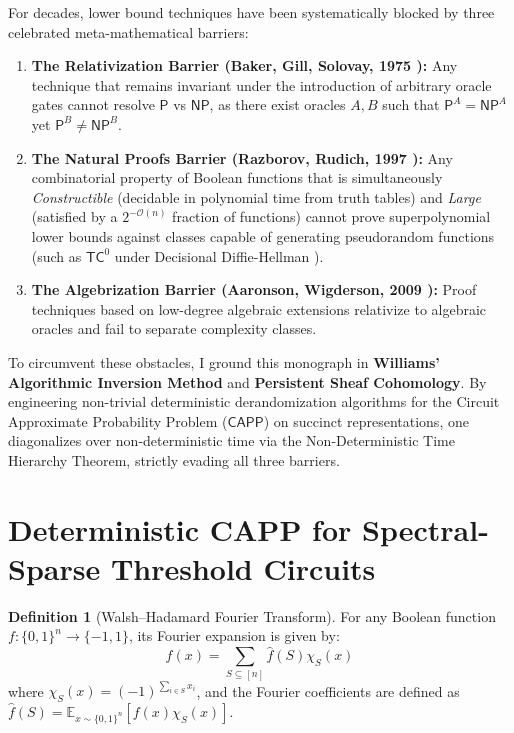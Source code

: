 \documentclass[11pt,a4paper]{article}
\theoremstyle{definition}
\newtheorem{definition}[theorem]{Definition}
\theoremstyle{remark}
\newcommand{\NP}{\mathsf{NP}}
\newcommand{\PP}{\mathsf{P}}
\newcommand{\TC}{\mathsf{TC}}
\newcommand{\CAPP}{\mathsf{CAPP}}
\newcommand{\E}{\mathbb{E}}
\begin{document}
For decades, lower bound techniques have been systematically blocked by three celebrated meta-mathematical barriers:
\begin{enumerate}
    \item \textbf{The Relativization Barrier (Baker, Gill, Solovay, 1975 \cite{bgs75}):} Any technique that remains invariant under the introduction of arbitrary oracle gates cannot resolve $\PP$ vs $\NP$, as there exist oracles $A, B$ such that $\PP^A = \NP^A$ yet $\PP^B \neq \NP^B$.
    \item \textbf{The Natural Proofs Barrier (Razborov, Rudich, 1997 \cite{rr97}):} Any combinatorial property of Boolean functions that is simultaneously \emph{Constructible} (decidable in polynomial time from truth tables) and \emph{Large} (satisfied by a $2^{-\mathcal{O}(n)}$ fraction of functions) cannot prove superpolynomial lower bounds against classes capable of generating pseudorandom functions (such as $\TC^0$ under Decisional Diffie-Hellman \cite{nr04}).
    \item \textbf{The Algebrization Barrier (Aaronson, Wigderson, 2009 \cite{aw09}):} Proof techniques based on low-degree algebraic extensions relativize to algebraic oracles and fail to separate complexity classes.
\end{enumerate}

To circumvent these obstacles, I ground this monograph in \textbf{Williams' Algorithmic Inversion Method} \cite{williams11,williams14} and \textbf{Persistent Sheaf Cohomology}. By engineering non-trivial deterministic derandomization algorithms for the Circuit Approximate Probability Problem ($\CAPP$) on succinct representations, one diagonalizes over non-deterministic time via the Non-Deterministic Time Hierarchy Theorem, strictly evading all three barriers.

\section{Deterministic CAPP for Spectral-Sparse Threshold Circuits}

\begin{definition}[Walsh--Hadamard Fourier Transform]
For any Boolean function $f : \{0,1\}^n \to \{-1, 1\}$, its Fourier expansion is given by:
\[
f(x) = \sum_{S \subseteq [n]} \hat{f}(S) \chi_S(x)
\]
where $\chi_S(x) = (-1)^{\sum_{i \in S} x_i}$, and the Fourier coefficients are defined as $\hat{f}(S) = \E_{x \sim \{0,1\}^n} [f(x) \chi_S(x)]$.
\end{definition}
\end{document}
